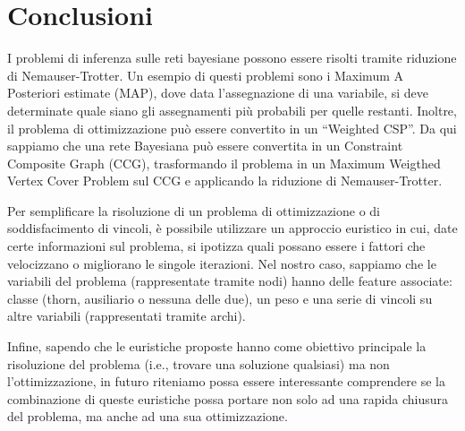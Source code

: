 \section{Conclusioni}
\label{sec:conclusioni}

I problemi di inferenza sulle reti bayesiane possono essere risolti tramite riduzione di Nemauser-Trotter. Un esempio di questi problemi sono i Maximum A Posteriori estimate (MAP), dove data l'assegnazione di una variabile, si deve determinate quale siano gli assegnamenti più probabili per quelle restanti. Inoltre, il problema di ottimizzazione può essere convertito in un ``Weighted CSP''. Da qui sappiamo che una rete Bayesiana può essere convertita in un Constraint Composite Graph (CCG), trasformando il problema in un Maximum Weigthed Vertex Cover Problem sul CCG e applicando la riduzione di Nemauser-Trotter.

Per semplificare la risoluzione di un problema di ottimizzazione o di soddisfacimento di vincoli, è possibile utilizzare un approccio euristico in cui, date certe informazioni sul problema, si ipotizza quali possano essere i fattori che velocizzano o migliorano le singole iterazioni. Nel nostro caso, sappiamo che le variabili del problema (rappresentate tramite nodi) hanno delle feature associate: classe (thorn, ausiliario o nessuna delle due), un peso e una serie di vincoli su altre variabili (rappresentati tramite archi).



Infine, sapendo che le euristiche proposte hanno come obiettivo principale la risoluzione del problema (i.e., trovare una soluzione qualsiasi) ma non l'ottimizzazione, in futuro riteniamo possa essere interessante comprendere se la combinazione di queste euristiche possa portare non solo ad una rapida chiusura del problema, ma anche ad una sua ottimizzazione.
